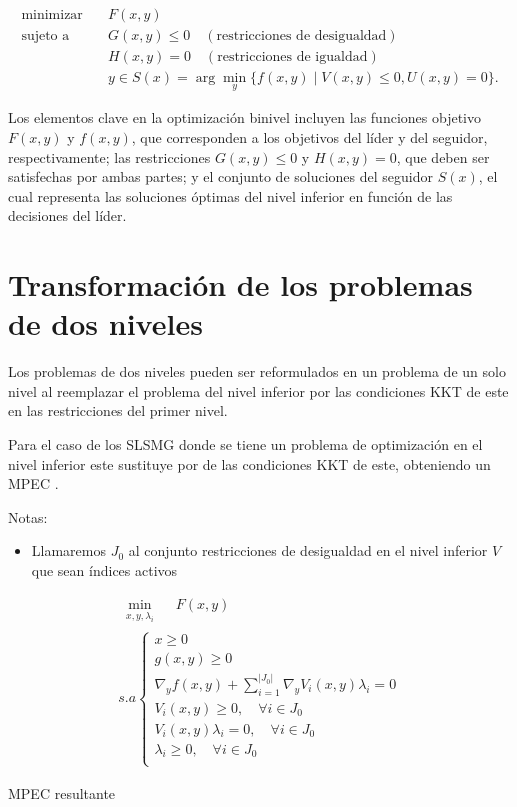 \begin{equation}
\begin{aligned}
\text{minimizar} & \quad F(x, y) \\
\text{sujeto a} & \quad G(x, y) \leq 0 \quad (\text{restricciones de desigualdad}) \\
& \quad H(x, y) = 0 \quad (\text{restricciones de igualdad}) \\
& \quad y \in S(x) = \arg \min_{y} \{ f(x, y) \mid V(x, y) \leq 0, U(x, y) = 0 \}.
\end{aligned}
\end{equation}

Los elementos clave en la optimización binivel incluyen las funciones objetivo $F(x, y)$ y $f(x, y)$, que corresponden a los objetivos del líder y del seguidor, respectivamente; las restricciones $G(x, y) \leq 0$ y $H(x, y) = 0$, que deben ser satisfechas por ambas partes; y el conjunto de soluciones del seguidor $S(x)$, el cual representa las soluciones óptimas del nivel inferior en función de las decisiones del líder.

\section{Transformación de los problemas de dos niveles}
		
		Los problemas de dos niveles pueden ser reformulados en un problema de un solo nivel al reemplazar el problema del nivel inferior por las condiciones KKT de este en las restricciones del primer nivel. 
		
		Para el caso de los SLSMG donde se tiene un problema de optimización en el nivel inferior este sustituye por de las condiciones KKT de este, obteniendo un MPEC \autocite{aussel2020}.
		
        
        Notas:
        \begin{itemize}
            \item Llamaremos $J_{0}$ al conjunto restricciones de desigualdad en el nivel inferior $V$ que sean índices activos
            
        \end{itemize}
		\begin{table}[H]

		\[\begin{array}{l}
			\underset{\substack{x, y, \lambda_i}}{\min} \quad F(x, y)\\
			s.a \left\{ \begin{array}{l}
				x \geq 0 \\
				g(x, y) \geq 0\\
				\nabla_{y} f(x, y) + \sum_{i=1}^{|J_{0}|} \nabla_{y} V_i(x, y) \lambda_i = 0 \\
				V_i(x, y) \geq 0, \quad \forall i \in J_{0} \\
				V_i(x, y)\lambda_i = 0, \quad \forall i \in J_{0} \\
				\lambda_i \geq 0, \quad \forall i \in J_{0}\\
			\end{array}\right.
		\end{array}\]
		\caption*{MPEC resultante}
		\end{table}


